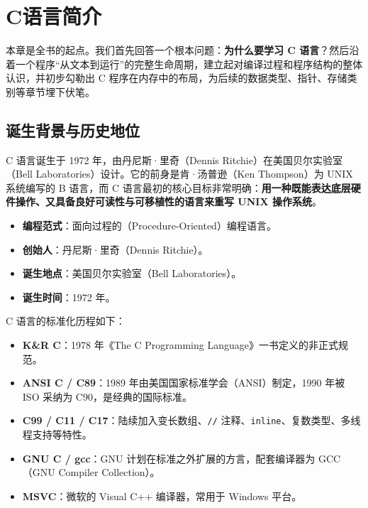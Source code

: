 \clearpage
\begingroup
\let\clearpage\relax
\let\cleardoublepage\relax
\vspace*{\fill}
\chapter{C语言简介}
\vspace*{\fill}
\endgroup
\clearpage


本章是全书的起点。我们首先回答一个根本问题：\textbf{为什么要学习 C 语言}？然后沿着一个程序“从文本到运行”的完整生命周期，建立起对编译过程和程序结构的整体认识，并初步勾勒出 C 程序在内存中的布局，为后续的数据类型、指针、存储类别等章节埋下伏笔。

\section{诞生背景与历史地位}

C 语言诞生于 1972 年，由丹尼斯·里奇（Dennis Ritchie）在美国贝尔实验室（Bell Laboratories）设计。它的前身是肯·汤普逊（Ken Thompson）为 UNIX 系统编写的 B 语言，而 C 语言最初的核心目标非常明确：\textbf{用一种既能表达底层硬件操作、又具备良好可读性与可移植性的语言来重写 UNIX 操作系统}。

\begin{itemize}
    \item \textbf{编程范式}：面向过程的（Procedure-Oriented）编程语言。
    \item \textbf{创始人}：丹尼斯·里奇（Dennis Ritchie）。
    \item \textbf{诞生地点}：美国贝尔实验室（Bell Laboratories）。
    \item \textbf{诞生时间}：1972 年。
\end{itemize}

C 语言的标准化历程如下：

\begin{itemize}
    \item \textbf{K\&R C}：1978 年《The C Programming Language》一书定义的非正式规范。
    \item \textbf{ANSI C / C89}：1989 年由美国国家标准学会（ANSI）制定，1990 年被 ISO 采纳为 C90，是经典的国际标准。
    \item \textbf{C99 / C11 / C17}：陆续加入变长数组、\texttt{//} 注释、\texttt{inline}、复数类型、多线程支持等特性。
    \item \textbf{GNU C / gcc}：GNU 计划在标准之外扩展的方言，配套编译器为 GCC（GNU Compiler Collection）。
    \item \textbf{MSVC}：微软的 Visual C++ 编译器，常用于 Windows 平台。
\end{itemize}

